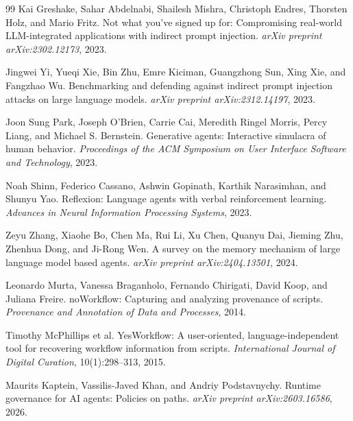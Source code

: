\documentclass[10pt]{article}
\begin{document}
\begin{thebibliography}{99}
Kai Greshake, Sahar Abdelnabi, Shailesh Mishra, Christoph Endres, Thorsten Holz, and Mario Fritz.
\newblock Not what you've signed up for: Compromising real-world LLM-integrated applications with indirect prompt injection.
\newblock \emph{arXiv preprint arXiv:2302.12173}, 2023.

Jingwei Yi, Yueqi Xie, Bin Zhu, Emre Kiciman, Guangzhong Sun, Xing Xie, and Fangzhao Wu.
\newblock Benchmarking and defending against indirect prompt injection attacks on large language models.
\newblock \emph{arXiv preprint arXiv:2312.14197}, 2023.

Joon Sung Park, Joseph O'Brien, Carrie Cai, Meredith Ringel Morris, Percy Liang, and Michael S. Bernstein.
\newblock Generative agents: Interactive simulacra of human behavior.
\newblock \emph{Proceedings of the ACM Symposium on User Interface Software and Technology}, 2023.

Noah Shinn, Federico Cassano, Ashwin Gopinath, Karthik Narasimhan, and Shunyu Yao.
\newblock Reflexion: Language agents with verbal reinforcement learning.
\newblock \emph{Advances in Neural Information Processing Systems}, 2023.

Zeyu Zhang, Xiaohe Bo, Chen Ma, Rui Li, Xu Chen, Quanyu Dai, Jieming Zhu, Zhenhua Dong, and Ji-Rong Wen.
\newblock A survey on the memory mechanism of large language model based agents.
\newblock \emph{arXiv preprint arXiv:2404.13501}, 2024.

Leonardo Murta, Vanessa Braganholo, Fernando Chirigati, David Koop, and Juliana Freire.
\newblock noWorkflow: Capturing and analyzing provenance of scripts.
\newblock \emph{Provenance and Annotation of Data and Processes}, 2014.

Timothy McPhillips et al.
\newblock YesWorkflow: A user-oriented, language-independent tool for recovering workflow information from scripts.
\newblock \emph{International Journal of Digital Curation}, 10(1):298--313, 2015.

Maurits Kaptein, Vassilis-Javed Khan, and Andriy Podstavnychy.
\newblock Runtime governance for AI agents: Policies on paths.
\newblock \emph{arXiv preprint arXiv:2603.16586}, 2026.

\end{thebibliography}
\end{document}
